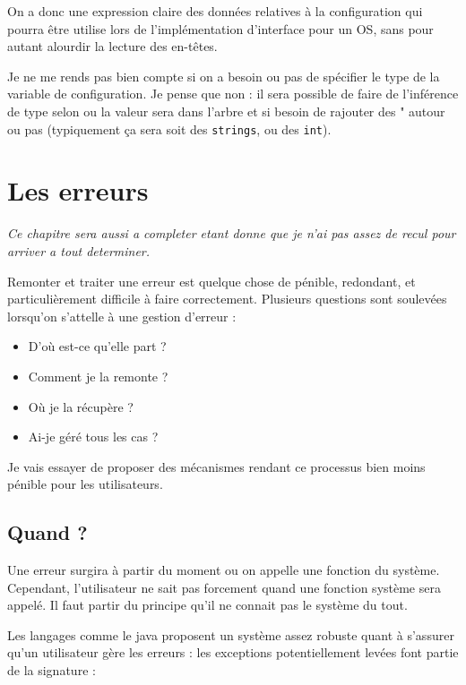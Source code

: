 \documentclass{rtxreport}
\begin{document}

On a donc une expression claire des données relatives à la configuration qui
pourra être utilise lors de l’implémentation d’interface pour un OS, sans pour
autant alourdir la lecture des en-têtes.

Je ne me rends pas bien compte si on a besoin ou pas de spécifier le type de la
variable de configuration. Je pense que non : il sera possible de faire de
l’inférence de type selon ou la valeur sera dans l’arbre et si besoin de
rajouter des " autour ou pas (typiquement ça sera soit des \texttt{strings}, ou
des \texttt{int}).

\chapter{Les erreurs}

\emph{Ce chapitre sera aussi a completer etant donne que je n'ai pas assez de
recul pour arriver a tout determiner.}

Remonter et traiter une erreur est quelque chose de pénible, redondant, et
particulièrement difficile à faire correctement. Plusieurs questions sont
soulevées lorsqu’on s’attelle à une gestion d’erreur :
\begin{itemize}
	\item D’où est-ce qu’elle part ?
	\item Comment je la remonte ?
	\item Où je la récupère ?
	\item Ai-je géré tous les cas ?
\end{itemize}

Je vais essayer de proposer des mécanismes rendant ce processus bien moins
pénible pour les utilisateurs.

\section{Quand ?}
Une erreur surgira à partir du moment ou on appelle une fonction du système.
Cependant, l’utilisateur ne sait pas forcement quand une fonction système sera
appelé. Il faut partir du principe qu’il ne connait pas le système du tout.

Les langages comme le java proposent un système assez robuste quant à s’assurer
qu’un utilisateur gère les erreurs : les exceptions potentiellement levées font
partie de la signature :
\end{document}
